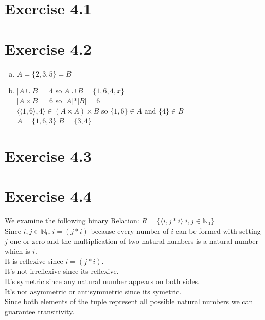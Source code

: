\documentclass{article} %
\newcommand{\homeworkNumber}{4}
\begin{document}
\section*{Exercise \homeworkNumber.1}

\section*{Exercise \homeworkNumber.2}
\begin{enumerate}[(a)]
    \item $A = \{2,3,5\} = B$
    \item $\lvert A \cup B\lvert = 4$  so $A \cup B = \{1,6,4,x\}$ \\
        $\lvert A \times B \lvert = 6$ so $\lvert A\lvert  * \lvert B\lvert  = 6$ \\
        $\langle\langle 1,6 \rangle,4\rangle \in (A \times A) \times B$ so $ \{1,6\} \in A$ and $ \{4\} \in B$ \\
        $ A = \{1,6,3\}$ $B = \{3,4\}$
\end{enumerate}
\section*{Exercise \homeworkNumber.3}

\section*{Exercise \homeworkNumber.4}
We examine the following binary Relation: $R = \{ \langle i,j*i \rangle \lvert i,j \in \mathbb N_0\}$ \\
Since $ i,j \in \mathbb N_0 , i = (j*i)$ because every number of $i$ can be formed with setting $j$ one or zero and the multiplication of two natural numbers is a natural number which is $i$.\\
It is reflexive since $i = (j*i)$. \\
It's not irreflexive since its reflexive. \\
It's symetric since any natural number appears on both sides. \\
It's not asymmetric or antisymmetric since its symetric. \\
Since both elements of the tuple represent all possible natural numbers we can guarantee transitivity. \\
\end{document}
